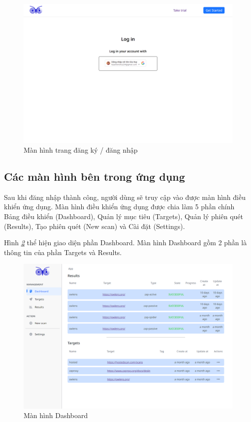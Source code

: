 \begin{figure}[H]
      \centering
      \includegraphics[width=\textwidth]{applied-thesis-chapters/chapter-6/Màn hình trang đăng nhập đăng ký.png}
      \caption{Màn hình trang đăng ký / đăng nhập}
      \label{fig:ManHinhTrangDangKyDangNhap}
\end{figure}

\subsection{Các màn hình bên trong ứng dụng}

\tab Sau khi đăng nhập thành công, người dùng sẽ truy cập vào được màn hình điều khiển ứng dụng.
Màn hình điều khiển ứng dụng được chia làm 5 phần chính Bảng điều khiển (Dashboard), Quản lý mục tiêu (Targets), Quản lý phiên quét (Results), Tạo phiên quét (New scan) và Cài đặt (Settings).

\tab \tab Hình \textit{\ref{fig:ManHinhDashboard} } thể hiện giao diện phần Dashboard.
Màn hình Dashboard gồm 2 phần là thông tin của phần Targets và Results.

\begin{figure}[H]
      \centering
      \includegraphics[width=\textwidth]{applied-thesis-chapters/chapter-6/Màn hình Dashboard.png}
      \caption{Màn hình Dashboard}
      \label{fig:ManHinhDashboard}
\end{figure}


